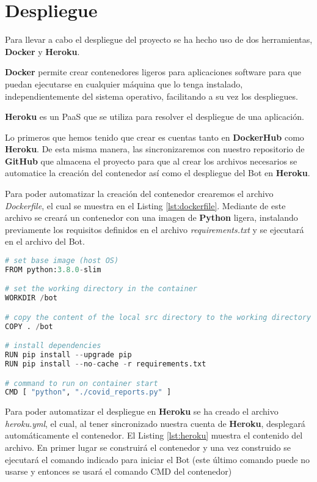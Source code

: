 \section{Despliegue}

Para llevar a cabo el despliegue del proyecto se ha hecho uso de dos herramientas, \textbf{Docker} y \textbf{Heroku}.

\textbf{Docker} permite crear contenedores ligeros para aplicaciones software para que puedan ejecutarse en cualquier máquina que lo tenga instalado, independientemente del sistema operativo, facilitando a su vez los despliegues.

\textbf{Heroku} es un PaaS que se utiliza para resolver el despliegue de una aplicación.

Lo primeros que hemos tenido que crear es cuentas tanto en \textbf{DockerHub} como \textbf{Heroku}. De esta misma manera, las sincronizaremos con nuestro repositorio de \textbf{GitHub} que almacena el proyecto para que al crear los archivos necesarios se automatice la creación del contenedor así como el despliegue del Bot en \textbf{Heroku}.

Para poder automatizar la creación del contenedor crearemos el archivo \textit{Dockerfile}, el cual se muestra en el Listing \ref{lst:dockerfile}. Mediante de este archivo se creará un contenedor con una imagen de \textbf{Python} ligera, instalando previamente los requisitos definidos en el archivo \textit{requirements.txt} y se ejecutará en el archivo del Bot.

\begin{lstlisting}[language=Python, caption={Archivo Dockerfile.}, label={lst:dockerfile}]
# set base image (host OS)
FROM python:3.8.0-slim

# set the working directory in the container
WORKDIR /bot

# copy the content of the local src directory to the working directory
COPY . /bot

# install dependencies
RUN pip install --upgrade pip
RUN pip install --no-cache -r requirements.txt

# command to run on container start
CMD [ "python", "./covid_reports.py" ]
\end{lstlisting}

Para poder automatizar el despliegue en \textbf{Heroku} se ha creado el archivo \textit{heroku.yml}, el cual, al tener sincronizado nuestra cuenta de \textbf{Heroku}, desplegará automáticamente el contenedor. El Listing \ref{lst:heroku} muestra el contenido del archivo. En primer lugar se construirá el contenedor y una vez construido se ejecutará el comando indicado para iniciar el Bot (este último comando puede no usarse y entonces se usará el comando CMD del contenedor)

